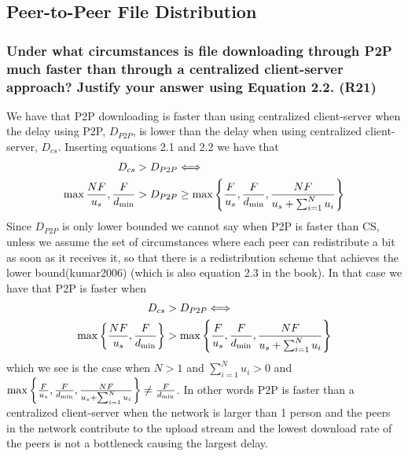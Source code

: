 \subsection{Peer-to-Peer File Distribution}


\subsubsection{Under what circumstances is file downloading through P2P much faster than through a centralized client-server approach? Justify your answer using Equation 2.2. (R21)}

We have that P2P downloading is faster than using centralized client-server when the delay using P2P, $D_{P2P}$, is lower than the delay when using centralized client-server, $D_{cs}$. Inserting equations 2.1 and 2.2 we have that
\begin{equation*}
\begin{split}
      D_{cs} &> D_{P2P} \Longleftrightarrow \\
      \max \frac{NF}{u_s}, \frac{F}{d_\text{min}} &> D_{P2P} \geq \max \left \{\frac{F}{u_s}, \frac{F}{d_\text{min}}, \frac{NF}{u_s + \sum_{i = 1}^{N} u_i}\right\}
\end{split}
\end{equation*}
Since $D_{P2P}$ is only lower bounded we cannot say when P2P is faster than CS, unless we assume the set of circumstances where each peer can redistribute a bit as soon as it receives it, so that there is a redistribution scheme that achieves the lower bound(kumar2006) (which is also equation 2.3 in the book). In that case we have that P2P is faster when
\begin{equation*}
\begin{split}
      D_{cs} &> D_{P2P} \Longleftrightarrow \\
      \max \left \{\frac{NF}{u_s}, \frac{F}{d_\text{min}}\right\} &> \max \left \{\frac{F}{u_s}, \frac{F}{d_\text{min}}, \frac{NF}{u_s + \sum_{i = 1}^{N} u_i}\right\}
\end{split}
\end{equation*}
which we see is the case when $N > 1$ and $\sum_{i = 1}^{N} u_i > 0$ and $\max \left \{\frac{F}{u_s}, \frac{F}{d_\text{min}}, \frac{NF}{u_s + \sum_{i = 1}^{N} u_i}\right\} \neq \frac{F}{d_\text{min}}$. In other words P2P is faster than a centralized client-server when the network is larger than 1 person and the peers in the network contribute to the upload stream and the lowest download rate of the peers is not a bottleneck causing the largest delay.


